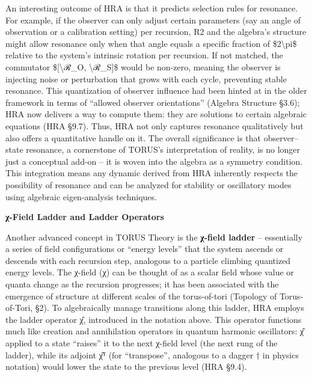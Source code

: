 \documentclass[]{article}
\begin{document}
An interesting outcome of HRA is that it predicts selection rules for
resonance. For example, if the observer can only adjust certain
parameters (say an angle of observation or a calibration setting) per
recursion, R2 and the algebra's structure might allow resonance only
when that angle equals a specific fraction of \$2\textbackslash{}pi\$
relative to the system's intrinsic rotation per recursion. If not
matched, the commutator \${[}\textbackslash{}ℛ\_O,
\textbackslash{}ℛ\_S{]}\$ would be non-zero, meaning the observer is
injecting noise or perturbation that grows with each cycle, preventing
stable resonance. This quantization of observer influence had been
hinted at in the older framework in terms of ``allowed observer
orientations'' (Algebra Structure §3.6); HRA now delivers a way to
compute them: they are solutions to certain algebraic equations (HRA
§9.7). Thus, HRA not only captures resonance qualitatively but also
offers a quantitative handle on it. The overall significance is that
observer--state resonance, a cornerstone of TORUS's interpretation of
reality, is no longer just a conceptual add-on -- it is woven into the
algebra as a symmetry condition. This integration means any dynamic
derived from HRA inherently respects the possibility of resonance and
can be analyzed for stability or oscillatory modes using algebraic
eigen-analysis techniques.

\textbf{χ-Field Ladder and Ladder Operators}

Another advanced concept in TORUS Theory is the \textbf{χ-field ladder}
-- essentially a series of field configurations or ``energy levels''
that the system ascends or descends with each recursion step, analogous
to a particle climbing quantized energy levels. The χ-field (χ) can be
thought of as a scalar field whose value or quanta change as the
recursion progresses; it has been associated with the emergence of
structure at different scales of the torus-of-tori (Topology of
Torus-of-Tori, §2). To algebraically manage transitions along this
ladder, HRA employs the ladder operator χ̂, introduced in the notation
above. This operator functions much like creation and annihilation
operators in quantum harmonic oscillators: χ̂ applied to a state
``raises'' it to the next χ-field level (the next rung of the ladder),
while its adjoint χ̂ᵀ (for ``transpose'', analogous to a dagger † in
physics notation) would lower the state to the previous level (HRA
§9.4).
\end{document}

